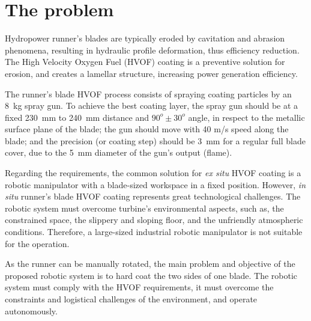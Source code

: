 \section{The problem}



Hydropower runner's blades are typically eroded by cavitation and abrasion
phenomena, resulting in hydraulic profile deformation, thus efficiency
reduction. The High Velocity Oxygen Fuel (HVOF) coating is a preventive
solution for erosion, and creates a lamellar structure, increasing
power generation efficiency. 

The runner's blade HVOF process consists of spraying coating particles
by an 8~kg spray gun. To achieve the best coating layer, the spray gun should be at a
fixed 230~mm to 240~mm distance and $90^o \pm 30^o$ angle, in respect
to the metallic surface plane of the blade; the gun should move with 40 m/s
speed along the blade; and the precision (or coating step) should be 3~mm for a
regular full blade cover, due to the 5~mm diameter of the gun's output (flame).

Regarding the requirements, the common solution for \textit{ex situ} HVOF
coating is a robotic manipulator with a blade-sized workspace in a fixed
position. However, \textit{in situ} runner's blade HVOF coating represents
great technological challenges. The robotic system must overcome
turbine's environmental aspects, such as, the constrained space, the slippery
and sloping floor, and the unfriendly atmospheric conditions. Therefore, a
large-sized industrial robotic manipulator is not suitable for the operation.

As the runner can be manually rotated, the main problem and objective of the
proposed robotic system is to hard coat the two sides of one blade. The
robotic system must comply with the HVOF requirements, it must overcome the
constraints and logistical challenges of the environment, and operate
autonomously. 

\begin{comment}
In the case of the Jirau hydroelectric dam, the coating of turbine's blades is
performed before turbine assembling and installation. However, the abrasion due
to a large number of particles and sediment in the Madeira river and the recent
identified cavitation require recoating in short intervals \citep{santa2009slurry}.
\end{comment}